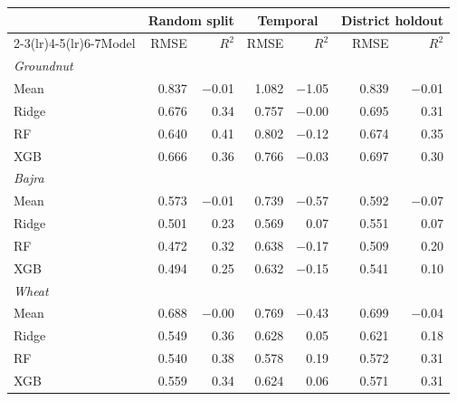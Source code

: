 \begin{tabular}{lrrrrrr}
\toprule
 & \multicolumn{2}{c}{Random split} & \multicolumn{2}{c}{Temporal} & \multicolumn{2}{c}{District holdout} \\ \cmidrule(lr){2-3}\cmidrule(lr){4-5}\cmidrule(lr){6-7}Model & RMSE & $R^2$ & RMSE & $R^2$ & RMSE & $R^2$ \\
\midrule
\multicolumn{7}{l}{\textit{Groundnut}} \\
Mean & 0.837 & $-$0.01 & 1.082 & $-$1.05 & 0.839 & $-$0.01 \\
Ridge & 0.676 & 0.34 & 0.757 & $-$0.00 & 0.695 & 0.31 \\
RF & 0.640 & 0.41 & 0.802 & $-$0.12 & 0.674 & 0.35 \\
XGB & 0.666 & 0.36 & 0.766 & $-$0.03 & 0.697 & 0.30 \\
\multicolumn{7}{l}{\textit{Bajra}} \\
Mean & 0.573 & $-$0.01 & 0.739 & $-$0.57 & 0.592 & $-$0.07 \\
Ridge & 0.501 & 0.23 & 0.569 & 0.07 & 0.551 & 0.07 \\
RF & 0.472 & 0.32 & 0.638 & $-$0.17 & 0.509 & 0.20 \\
XGB & 0.494 & 0.25 & 0.632 & $-$0.15 & 0.541 & 0.10 \\
\multicolumn{7}{l}{\textit{Wheat}} \\
Mean & 0.688 & $-$0.00 & 0.769 & $-$0.43 & 0.699 & $-$0.04 \\
Ridge & 0.549 & 0.36 & 0.628 & 0.05 & 0.621 & 0.18 \\
RF & 0.540 & 0.38 & 0.578 & 0.19 & 0.572 & 0.31 \\
XGB & 0.559 & 0.34 & 0.624 & 0.06 & 0.571 & 0.31 \\
\bottomrule
\end{tabular}
